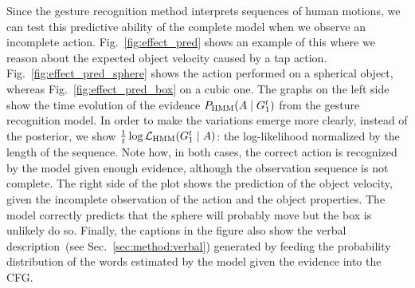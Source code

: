 Since the gesture recognition method interprets sequences of human motions, we can test this predictive ability of the complete model when we observe an incomplete action.
Fig.~\ref{fig:effect_pred} shows an example of this where we reason about the expected object velocity caused by a tap action.
Fig.~\ref{fig:effect_pred_sphere} shows the action performed on a spherical object, whereas Fig.~\ref{fig:effect_pred_box} on a cubic one.
The graphs on the left side show the time evolution of the evidence $P_{\text{HMM}}(A \mid G_1^t)$ from the gesture recognition model.
In order to make the variations emerge more clearly, instead of the posterior, we show $\frac{1}{t} \log \mathcal{L}_\text{HMM} (G_1^t \mid A)$: the log-likelihood normalized by the length of the sequence.
Note how, in both cases, the correct action is recognized by the model given enough evidence, although the observation sequence is not complete.
The right side of the plot shows the prediction of the object velocity, given the incomplete observation of the action and the object properties.
The model correctly predicts that the sphere will probably move but the box is unlikely do so.
Finally, the captions in the figure also show the verbal description~(see Sec.~\ref{sec:method:verbal}) generated by feeding the probability distribution of the words estimated by the model given the evidence into the \acl{CFG}.

\begin{table}
    \centering
    \caption{$10$-best list of sentences generated from the evidence $\xobs = \{ \text{Color=yellow, Size=big, Shape=sphere, ObjVel=fast} \}$.}
    \label{tab:example_generated_sentences}
\end{table}

